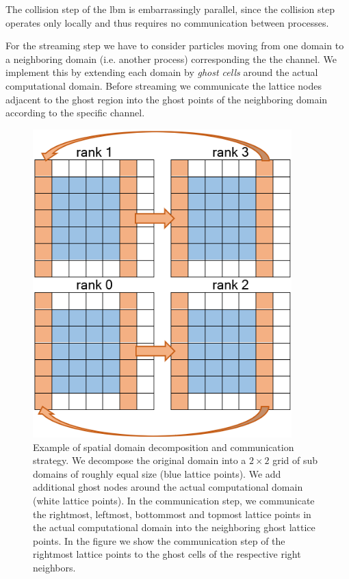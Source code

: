 \documentclass[a4paper,11pt, footsepline]{book}
\begin{document}
The collision step of the \ac{lbm} is embarrassingly parallel, since the collision step operates only locally and thus requires no communication between processes.

For the streaming step we have to consider particles moving from one domain to a neighboring domain (i.e. another process) corresponding the the channel. We implement this by extending each domain by \textit{ghost cells} around the actual computational domain. Before streaming we communicate the lattice nodes adjacent to the ghost region into the ghost points of the neighboring domain according to the specific channel. 

\begin{figure}
  \begin{center}
   \includegraphics[width=10cm]{../figures/parallelization_strategy/parallelization_scheme.png}
   \caption{Example of spatial domain decomposition and communication strategy. We decompose the original domain into a $2\times 2$ grid of sub domains of roughly equal size (blue lattice points). We add additional ghost nodes around the actual computational domain (white lattice points). In the communication step, we communicate the rightmost, leftmost, bottommost and topmost lattice points in the actual computational domain into the neighboring ghost lattice points. In the figure we show the communication step of the rightmost lattice points to the ghost cells of the respective  right neighbors.}
  \label{fig:parallelizationScheme}
  \end{center}
\end{figure}
\end{document}
